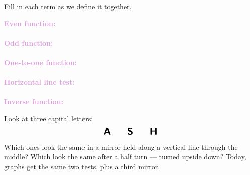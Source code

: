\documentclass[10pt]{article}
\begin{document}

\vspace{0.12in}

\boxguard
\begin{vocabbox}
Fill in each term as we define it together.
\par\vspace{2pt}
\noindent\textbf{\textcolor{plum}{Even function:}}\\[1pt]
\writeline\\[3pt]
\noindent\textbf{\textcolor{plum}{Odd function:}}\\[1pt]
\writeline\\[3pt]
\noindent\textbf{\textcolor{plum}{One-to-one function:}}\\[1pt]
\writeline\\[3pt]
\noindent\textbf{\textcolor{plum}{Horizontal line test:}}\\[1pt]
\writeline\\[3pt]
\noindent\textbf{\textcolor{plum}{Inverse function:}}\\[1pt]
\writeline
\end{vocabbox}

\vspace{0.1in}

\boxguard
\begin{hookbox}
Look at three capital letters:
\[ \textsf{\textbf{\Large A} \qquad \textbf{\Large S} \qquad \textbf{\Large H}} \]
Which ones look the same in a mirror held along a vertical line through the middle? Which
look the same after a half turn --- turned upside down? Today, graphs get the same two tests,
plus a third mirror.
\end{hookbox}
\end{document}
